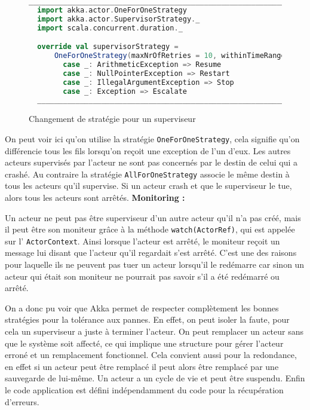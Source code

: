 \documentclass[11pt, a4paper]{article}
\begin{document}
\begin{figure}[ht]
  \begin{lstlisting}[language=scala]
  __________________________________________________________________________
  import akka.actor.OneForOneStrategy
  import akka.actor.SupervisorStrategy._
  import scala.concurrent.duration._

  override val supervisorStrategy =
      OneForOneStrategy(maxNrOfRetries = 10, withinTimeRange = 1 minute) {
        case _: ArithmeticException => Resume
        case _: NullPointerException => Restart
        case _: IllegalArgumentException => Stop
        case _: Exception => Escalate
  __________________________________________________________________________
  \end{lstlisting}
  \caption{Changement de stratégie pour un superviseur \cite{akka}}
  \label{fig3}
\end{figure}
\par On peut voir ici qu'on utilise la stratégie \texttt{OneForOneStrategy}, cela signifie qu'on différencie tous les fils lorsqu'on reçoit une exception de l'un d'eux. Les autres acteurs supervisés par l'acteur ne sont pas concernés par le destin de celui qui a crashé. Au contraire la stratégie \texttt{AllForOneStrategy} associe le même destin à tous les acteurs qu'il supervise. Si un acteur crash et que le superviseur le tue, alors tous les acteurs sont arrêtés.
\newline
\newline
\textbf{Monitoring :}
\par Un acteur ne peut pas être superviseur d'un autre acteur qu'il n'a pas créé, mais il peut être son moniteur grâce à la méthode \texttt{watch(ActorRef)}, qui est appelée sur l' \texttt{ActorContext}. Ainsi lorsque l'acteur est arrêté, le moniteur reçoit un message lui disant que l'acteur qu'il regardait s'est arrêté. C'est une des raisons pour laquelle ils ne peuvent pas tuer un acteur lorsqu'il le redémarre car sinon un acteur qui était son moniteur ne pourrait pas savoir s'il a été redémarré ou arrêté.
\newline
\par 
On a donc pu voir que Akka permet de respecter complètement les bonnes stratégies pour la tolérance aux pannes. En effet, on peut isoler la faute, pour cela un superviseur a juste à terminer l'acteur. On peut remplacer un acteur sans que le système soit affecté, ce qui implique une structure pour gérer l'acteur erroné et un remplacement fonctionnel. Cela convient aussi pour la redondance, en effet si un acteur peut être remplacé il peut alors être remplacé par une sauvegarde de lui-même. Un acteur a un cycle de vie et peut être suspendu. Enfin le code application est défini indépendamment du code pour la récupération d'erreurs.
\end{document}
